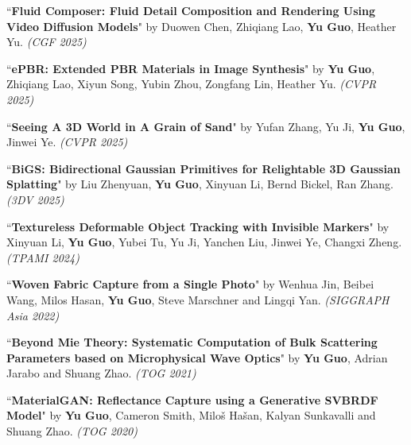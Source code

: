 \documentclass[margin,line]{resume}
\begin{document}
\begin{resume}
	\vspace{-5mm}	

	``\textbf{Fluid Composer: Fluid Detail Composition and Rendering Using Video Diffusion Models}" 
	by Duowen Chen, Zhiqiang Lao, \textbf{Yu Guo}, Heather Yu.
	\textsl{(CGF 2025)}\\

	\vspace{-5mm}	

	``\textbf{ePBR: Extended PBR Materials in Image Synthesis}" 
	by \textbf{Yu Guo}, Zhiqiang Lao, Xiyun Song, Yubin Zhou, Zongfang Lin, Heather Yu.
	\textsl{(CVPR 2025)}\\

	\vspace{-5mm}	

	``\textbf{Seeing A 3D World in A Grain of Sand}" 
	by Yufan Zhang, Yu Ji, \textbf{Yu Guo}, Jinwei Ye.
	\textsl{(CVPR 2025)}\\
	
	\vspace{-5mm}

	``\textbf{BiGS: Bidirectional Gaussian Primitives for Relightable 3D Gaussian Splatting}" 
	by Liu Zhenyuan, \textbf{Yu Guo}, Xinyuan Li, Bernd Bickel, Ran Zhang.
	\textsl{(3DV 2025)}\\
	
	\vspace{-5mm}

	``\textbf{Textureless Deformable Object Tracking with Invisible Markers}" 
	by Xinyuan Li, \textbf{Yu Guo}, Yubei Tu, Yu Ji, Yanchen Liu, Jinwei Ye, Changxi Zheng.
	\textsl{(TPAMI 2024)}\\
	
	\vspace{-5mm}
	
	``\textbf{Woven Fabric Capture from a Single Photo}" 
	by Wenhua Jin, Beibei Wang, Milos Hasan, \textbf{Yu Guo}, Steve Marschner and Lingqi Yan. 
	\textsl{(SIGGRAPH Asia 2022)}\\
	
	\vspace{-5mm}
	
	``\textbf{Beyond Mie Theory: Systematic Computation of Bulk Scattering Parameters based on Microphysical Wave Optics}" 
	by \textbf{Yu Guo}, Adrian Jarabo and Shuang Zhao. 
	\textsl{(TOG 2021)}\\
	
	\vspace{-5mm}
	
	``\textbf{MaterialGAN: Reflectance Capture using a Generative SVBRDF Model}" 
	by \textbf{Yu Guo}, Cameron Smith, Milo\v{s} Ha\v{s}an, Kalyan Sunkavalli and Shuang Zhao. 
	\textsl{(TOG 2020)}\\
	

\end{resume}
\end{document}
